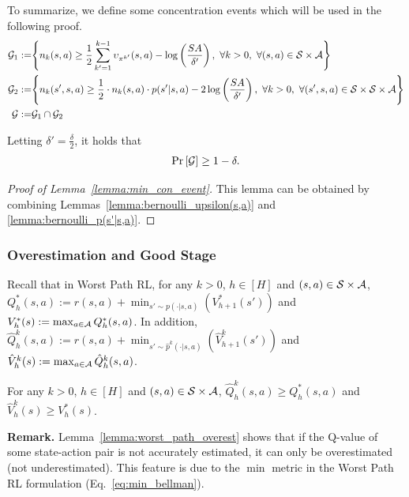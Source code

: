 To summarize, we define some concentration events which will be used in the following proof.
\begin{align*}
	\cG_1:= & \Bigg\{ n_k(s,a) \geq \frac{1}{2} \sum_{k'=1}^{k-1} \upsilon_{\pi^{k'}}(s,a) - \log \sbr{\frac{SA}{\delta'}}, \ \forall k>0,\ \forall (s,a) \in \cS \times \cA \Bigg\} 
	\\
	\cG_2:= & \Bigg\{  n_k(s',s,a) \geq \frac{1}{2} \cdot n_k(s,a) \cdot p(s'|s,a) - 2 \log \sbr{\frac{SA}{\delta'}}, \ 
	\forall k>0,\ \forall (s',s,a) \in \cS \times \cS \times \cA \Bigg\} 
	\\
	\cG:= & \cG_1 \cap \cG_2 
\end{align*}


\begin{lemma}\label{lemma:min_con_event}
	Letting $\delta'=\frac{\delta}{2}$, it holds that
	\begin{align*}
		\Pr \left[ \mathcal{G} \right] \geq 1-\delta .
	\end{align*}
\end{lemma}
\begin{proof}[Proof of Lemma~\ref{lemma:min_con_event}]
	This lemma can be obtained by combining Lemmas~\ref{lemma:bernoulli_upsilon(s,a)} and \ref{lemma:bernoulli_p(s'|s,a)}.
\end{proof}



\subsubsection{Overestimation and Good Stage}


Recall that in Worst Path RL, for any $k>0$, $h \in [H]$ and $(s,a) \in \mathcal{S} \times \mathcal{A}$, $Q^{*}_h(s,a):= r(s,a)+ \min_{s' \sim p(\cdot|s,a)}(V^{*}_{h+1}(s'))$ and $V^{*}_h(s):= \max_{a \in \mathcal{A}} Q^{*}_h(s,a)$. In addition, $\hat{Q}^k_h(s,a) := r(s,a)+\min_{s' \sim \hat{p}^k(\cdot|s,a)}(\hat{V}^k_{h+1}(s'))$ and $\hat{V}^k_h(s) := \max_{a \in \mathcal{A}} \hat{Q}^k_h(s,a)$.

\begin{lemma}[Overestimation] \label{lemma:worst_path_overest}
	For any $k>0$, $h \in [H]$ and $(s,a) \in \mathcal{S} \times \mathcal{A}$, $\hat{Q}^{k}_h(s,a) \geq Q^{*}_h(s,a)$ and $\hat{V}^{k}_h(s) \geq V^{*}_h(s)$. 
\end{lemma}

\textbf{Remark.} Lemma~\ref{lemma:worst_path_overest} shows that if the Q-value of some state-action pair is not accurately estimated, it can only be overestimated (not underestimated). This feature is due to the $\min$ metric in the Worst Path RL formulation (Eq.~\eqref{eq:min_bellman}).

